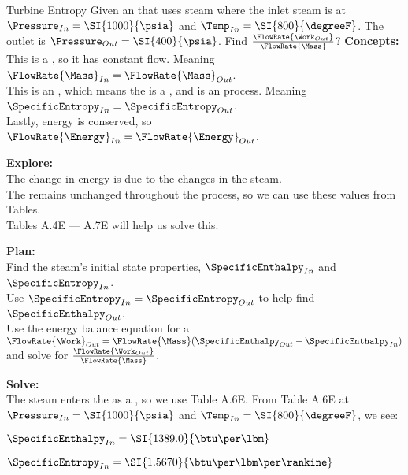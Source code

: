 \begin{example}{Turbine Entropy}
  Given an   that uses steam where the inlet steam is at $\Pressure_{In} = \SI{1000}{\psia}$ and $\Temp_{In} = \SI{800}{\degreeF}$.
  The outlet is $\Pressure_{Out} = \SI{400}{\psia}$.
  Find $\frac{\FlowRate{\Work_{Out}}}{\FlowRate{\Mass}}$?
  \tcblower{}
  \textbf{Concepts:} \\
  This is a , so it has constant flow.
  Meaning $\FlowRate{\Mass}_{In} = \FlowRate{\Mass}_{Out}$. \\
  This is an  , which means the  is a , and is an  process.
  Meaning $\SpecificEntropy_{In} = \SpecificEntropy_{Out}$. \\
  Lastly, energy is conserved, so $\FlowRate{\Energy}_{In} = \FlowRate{\Energy}_{Out}$.

  \textbf{Explore:} \\
  The change in energy is due to the  changes in the steam. \\
  The  remains unchanged throughout the process, so we can use these values from Tables. \\
  Tables A.4E --- A.7E will help us solve this.

  \textbf{Plan:} \\
  Find the steam's initial state properties, $\SpecificEnthalpy_{In}$ and $\SpecificEntropy_{In}$. \\
  Use $\SpecificEntropy_{In} = \SpecificEntropy_{Out}$ to help find $\SpecificEnthalpy_{Out}$. \\
  Use the energy balance equation for a  $\FlowRate{\Work}_{Out} = \FlowRate{\Mass}(\SpecificEnthalpy_{Out} - \SpecificEnthalpy_{In})$ and solve for $\frac{\FlowRate{\Work_{Out}}}{\FlowRate{\Mass}}$.

  \textbf{Solve:} \\
  The steam enters the  as a , so we use Table A.6E.
  From Table A.6E at $\Pressure_{In} = \SI{1000}{\psia}$ and $\Temp_{In} = \SI{800}{\degreeF}$, we see:
  \begin{description}[noitemsep]
  \item $\SpecificEnthalpy_{In} = \SI{1389.0}{\btu\per\lbm}$
  \item $\SpecificEntropy_{In} = \SI{1.5670}{\btu\per\lbm\per\rankine}$
  \end{description}


\end{example}
